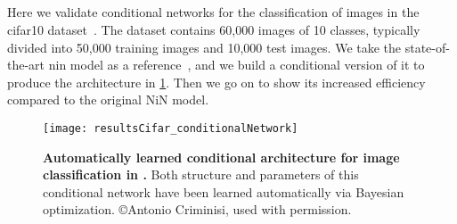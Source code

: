 \documentclass[thesis]{subfiles}
\begin{document}
	
	\subsection{}
	Here we validate conditional networks for the classification of images in the \gls{cifar10} dataset~\citep{CIFAR10}. 
	The dataset contains 60,000 images of 10 classes, typically divided into 50,000 training images and 10,000 test images. 
	We take the state-of-the-art \gls{nin} model 
	as a reference~\citep{Lin2013NiN}, and we build a conditional version of it to produce the architecture in \cref{fig:Cifar_CondNet}. 
	Then we go on to show its increased efficiency compared to the original NiN model.
	
	\begin{figure}[tbp]
		\centerline{
			\texttt{[image: resultsCifar\_conditionalNetwork]}
		}
		\caption[Automatically-learned conditional architecture for ]{\textbf{Automatically learned conditional architecture for image classification in .} Both structure and parameters of this conditional network have been learned automatically via Bayesian optimization. \copyright Antonio Criminisi, used with permission.}
		\label{fig:Cifar_CondNet}
	\end{figure}
	
\end{document}
